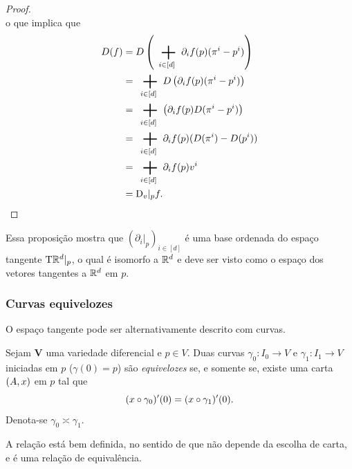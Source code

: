 \begin{proof}
\begin{equation*}
	\end{equation*}
o que implica que
	\begin{align*}
	D(f) &= D\left( \sum_{i \in [d]} \partial_i f(p) (\pi^i-p^i) \right) \\
		&= \sum_{i \in [d]} D\left( \partial_i f(p) (\pi^i-p^i) \right) \\
		&= \sum_{i \in [d]} \left( \partial_i f(p) D(\pi^i-p^i) \right) \\
		&= \sum_{i \in [d]} \partial_i f(p) (D(\pi^i)-D(p^i)) \\
		&= \sum_{i \in [d]} \partial_i f(p) v^i \\
		&= \D_v|_p f.
	\end{align*}
\end{proof}

Essa proposição mostra que $\left( \partial_i|_p \right)_{i \in [d]}$ é uma base ordenada do espaço tangente $\mathrm{T} \mathbb{R}^d|_p$, o qual é isomorfo a $\mathbb{R}^d$ e deve ser visto como o espaço dos vetores tangentes a $\mathbb{R}^d$ em $p$.

\subsubsection{Curvas equivelozes}

O espaço tangente pode ser alternativamente descrito com curvas.

\begin{definition}
Sejam $\bm V$ uma variedade diferencial e $p \in V$. Duas curvas $\gamma_0\colon I_0 \to V$ e $\gamma_1\colon I_1 \to V$ iniciadas em $p$ ($\gamma(0)=p$) são \emph{equivelozes} se, e somente se, existe uma carta $(A,x)$ em $p$ tal que
	\begin{equation*}
	(x \circ \gamma_0)'(0) = (x \circ \gamma_1)'(0).
	\end{equation*}
Denota-se $\gamma_0 \asymp \gamma_1$.
\end{definition}

A relação está bem definida, no sentido de que não depende da escolha de carta, e é uma relação de equivalência.

